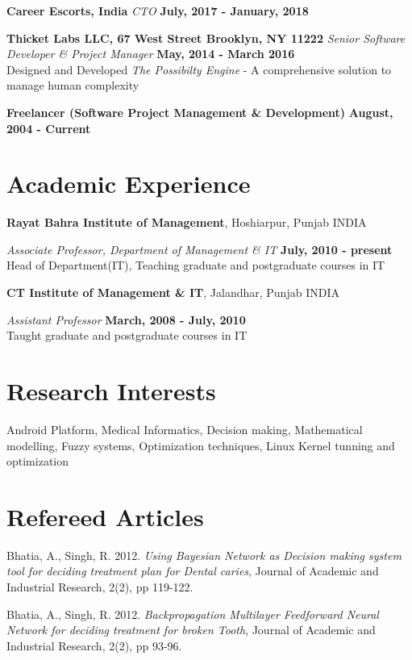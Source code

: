 \documentclass[margin,line]{res}
\begin{document}
\begin{resume}
{\bf Career Escorts, India}
{\em CTO} \hfill {\bf July, 2017 - January, 2018}

{\bf Thicket Labs LLC, 67 West Street Brooklyn, NY 11222}
{\em Senior Software Developer \& Project Manager} \hfill {\bf May, 2014 - March 2016}\\
Designed and Developed {\em The Possibilty Engine} - A comprehensive solution to manage human complexity

{\bf Freelancer (Software Project Management \& Development)} \hfill {\bf August, 2004 - Current}

\section{\sc Academic Experience}
{\bf Rayat Bahra Institute of Management}, Hoshiarpur, Punjab INDIA

\vspace{-.3cm}
{\em Associate Professor, Department of Management \& IT} \hfill {\bf July, 2010 - present}\\
Head of Department(IT), Teaching graduate and postgraduate courses in IT

{\bf CT Institute of Management \& IT}, Jalandhar, Punjab INDIA

\vspace{-.3cm}
{\em Assistant Professor} \hfill {\bf March, 2008 - July, 2010}\\
Taught graduate and postgraduate courses in IT

\section{\sc Research Interests}
Android Platform, Medical Informatics, Decision making, Mathematical modelling, Fuzzy systems, Optimization techniques, Linux Kernel tunning and optimization

\section{\sc Refereed Articles}

Bhatia, A., Singh, R. 2012. \emph{Using Bayesian Network as Decision making system tool for deciding treatment plan for Dental caries}, Journal of Academic and Industrial Research, 2(2), pp 119-122.

Bhatia, A., Singh, R. 2012. \emph{Backpropagation Multilayer Feedforward Neural Network for deciding treatment for broken Tooth}, Journal of Academic and Industrial Research, 2(2), pp 93-96.


\end{resume}
\end{document}

